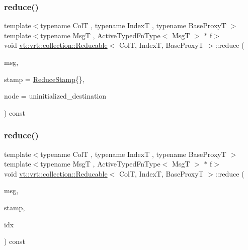 \subsubsection{\texorpdfstring{reduce()}{reduce()}\hspace{0.1cm}{\footnotesize\ttfamily [3/4]}}
{\footnotesize\ttfamily template$<$typename ColT , typename IndexT , typename Base\+ProxyT $>$ \\
template$<$typename MsgT , Active\+Typed\+Fn\+Type$<$ Msg\+T $>$ $\ast$ f$>$ \\
void \hyperlink{structvt_1_1vrt_1_1collection_1_1_reducable}{vt\+::vrt\+::collection\+::\+Reducable}$<$ ColT, IndexT, Base\+ProxyT $>$\+::reduce (\begin{DoxyParamCaption}\item[{MsgT $\ast$const}]{msg,  }\item[{\hyperlink{structvt_1_1vrt_1_1collection_1_1_reducable_a19f80baf23f36dad4948ef07322fd0cb}{Reduce\+Stamp}}]{stamp = {\ttfamily \hyperlink{structvt_1_1vrt_1_1collection_1_1_reducable_a19f80baf23f36dad4948ef07322fd0cb}{Reduce\+Stamp}\{\}},  }\item[{\hyperlink{namespacevt_a866da9d0efc19c0a1ce79e9e492f47e2}{Node\+Type} const \&}]{node = {\ttfamily uninitialized\+\_\+destination} }\end{DoxyParamCaption}) const}

\mbox{\label{structvt_1_1vrt_1_1collection_1_1_reducable_a1e6844e0d307172d4121de2becee4b6b}} 
\subsubsection{\texorpdfstring{reduce()}{reduce()}\hspace{0.1cm}{\footnotesize\ttfamily [4/4]}}
{\footnotesize\ttfamily template$<$typename ColT , typename IndexT , typename Base\+ProxyT $>$ \\
template$<$typename MsgT , Active\+Typed\+Fn\+Type$<$ Msg\+T $>$ $\ast$ f$>$ \\
void \hyperlink{structvt_1_1vrt_1_1collection_1_1_reducable}{vt\+::vrt\+::collection\+::\+Reducable}$<$ ColT, IndexT, Base\+ProxyT $>$\+::reduce (\begin{DoxyParamCaption}\item[{MsgT $\ast$const}]{msg,  }\item[{\hyperlink{structvt_1_1vrt_1_1collection_1_1_reducable_a19f80baf23f36dad4948ef07322fd0cb}{Reduce\+Stamp}}]{stamp,  }\item[{IndexT const \&}]{idx }\end{DoxyParamCaption}) const}

